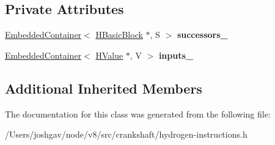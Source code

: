 \subsection*{Private Attributes}
\begin{DoxyCompactItemize}
\item 
\hyperlink{classv8_1_1internal_1_1_embedded_container}{Embedded\+Container}$<$ \hyperlink{classv8_1_1internal_1_1_h_basic_block}{H\+Basic\+Block} $\ast$, S $>$ {\bfseries successors\+\_\+}\hypertarget{classv8_1_1internal_1_1_h_template_control_instruction_a16d0fef3ca84584c3088f1312b87f8db}{}\label{classv8_1_1internal_1_1_h_template_control_instruction_a16d0fef3ca84584c3088f1312b87f8db}

\item 
\hyperlink{classv8_1_1internal_1_1_embedded_container}{Embedded\+Container}$<$ \hyperlink{classv8_1_1internal_1_1_h_value}{H\+Value} $\ast$, V $>$ {\bfseries inputs\+\_\+}\hypertarget{classv8_1_1internal_1_1_h_template_control_instruction_a4568a0033f7a78a5fe89843ceec9d717}{}\label{classv8_1_1internal_1_1_h_template_control_instruction_a4568a0033f7a78a5fe89843ceec9d717}

\end{DoxyCompactItemize}
\subsection*{Additional Inherited Members}


The documentation for this class was generated from the following file\+:\begin{DoxyCompactItemize}
\item 
/\+Users/joshgav/node/v8/src/crankshaft/hydrogen-\/instructions.\+h\end{DoxyCompactItemize}
